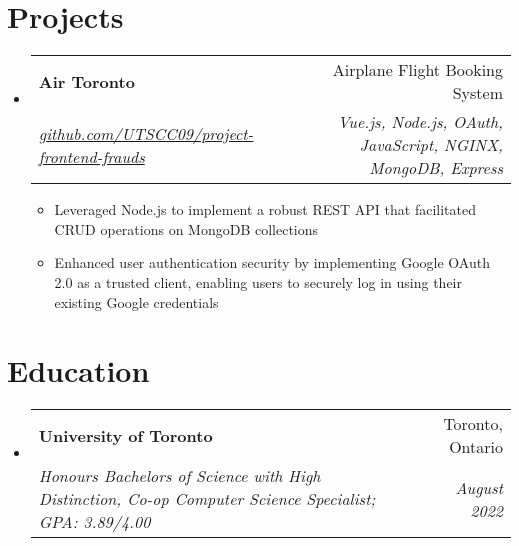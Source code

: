 \documentclass[letterpaper,10pt]{article}
\makeatletter
\newcommand{\resumeSubheading}[4]{
  \vspace{-1pt}\item
    \begin{tabular*}{0.97\textwidth}{l@{\extracolsep{\fill}}r}
      \textbf{#1} & #2 \\
      \textit{\small#3} & \textit{\small #4} \\
    \end{tabular*}\vspace{-2pt}
}
\newcommand{\resumeSubHeadingListStart}{\begin{itemize}[leftmargin=*]}
\newcommand{\resumeSubHeadingListEnd}{\end{itemize}}
\newcommand{\resumeItemListStart}{\begin{itemize}}
\newcommand{\resumeItemListEnd}{\end{itemize}\vspace{-3pt}}
\makeatother
\begin{document}
\section{Projects}
   \resumeSubHeadingListStart
   \resumeSubheading
      {Air Toronto}{Airplane Flight Booking System}
      {\footnotesize{\href{https://github.com/UTSCC09/project-frontend-frauds}{github.com/UTSCC09/project-frontend-frauds}}}{\small{Vue.js, Node.js, OAuth, JavaScript, NGINX, MongoDB, Express}}
      \resumeItemListStart
       \item{ \small{ Leveraged Node.js to implement a robust REST API that facilitated CRUD operations on MongoDB collections }}
       \item{ \small{ Enhanced user authentication security by implementing Google OAuth 2.0 as a trusted client, enabling users to securely log in using their existing Google credentials }}
       \resumeItemListEnd
  \resumeSubHeadingListEnd


\section{Education}
  \resumeSubHeadingListStart
    \resumeSubheading
      {University of Toronto}{Toronto, Ontario}
      {Honours Bachelors of Science with High Distinction, Co-op Computer Science Specialist;  GPA: 3.89/4.00}{August 2022}
 \resumeSubHeadingListEnd
 

\end{document}
